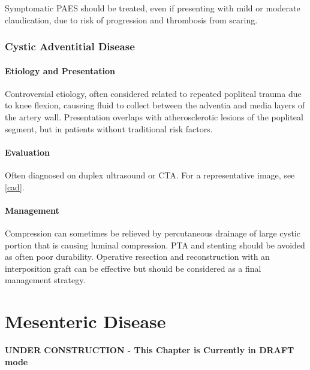\documentclass[
]{book}
\begin{document}
Symptomatic PAES should be treated, even if presenting with mild or
moderate claudication, due to risk of progression and thrombosis from
scaring.\citep{forbes2019}

\hypertarget{cystic-adventitial-disease}{%
\subsection{Cystic Adventitial Disease}\label{cystic-adventitial-disease}}

\hypertarget{etiology-and-presentation-3}{%
\subsubsection{Etiology and Presentation}\label{etiology-and-presentation-3}}

Controversial etiology, often considered related to repeated popliteal
trauma due to knee flexion, causeing fluid to collect between the
adventia and media layers of the artery wall. Presentation overlaps with
atherosclerotic lesions of the popliteal segment, but in patients
without traditional risk factors.

\hypertarget{evaluation-15}{%
\subsubsection{Evaluation}\label{evaluation-15}}

Often diagnosed on duplex ultrasound or CTA. For a representative image,
see \ref{cad}.

\hypertarget{management-22}{%
\subsubsection{Management}\label{management-22}}

Compression can sometimes be relieved by percutaneous drainage of large
cystic portion that is causing luminal compression. PTA and stenting
should be avoided as often poor durability. Operative resection and
reconstruction with an interposition graft can be effective but should
be considered as a final management strategy.\citep{li2017}

\hypertarget{mesenteric-disease}{%
\chapter{Mesenteric Disease}\label{mesenteric-disease}}

\textbf{UNDER CONSTRUCTION - This Chapter is Currently in DRAFT mode}
\end{document}

